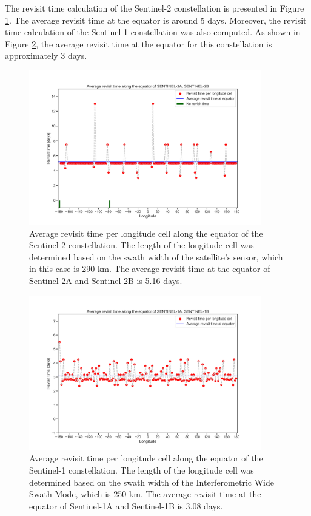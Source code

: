 
\bigskip
The revisit time calculation of the Sentinel-2 constellation is presented in Figure \ref{revisit_time_of_SENTINEL-2A_SENTINEL-2B}. The average revisit time at the equator is around 5 days. Moreover, the revisit time calculation of the Sentinel-1 constellation was also computed. As shown in Figure \ref{revisit_time_of_SENTINEL-1A_SENTINEL-1B}, the average revisit time at the equator for this constellation is approximately 3 days.

\begin{figure}
\centering
\includegraphics[width=0.9\textwidth]{Images/revisit_time_of_SENTINEL-2A_SENTINEL-2B.png}
\caption{Average revisit time per longitude cell along the equator of the Sentinel-2 constellation. The length of the longitude cell was determined based on the swath width of the satellite's sensor, which in this case is 290 km. The average revisit time at the equator of Sentinel-2A and Sentinel-2B is 5.16 days.}
\label{revisit_time_of_SENTINEL-2A_SENTINEL-2B}
\end{figure}

\begin{figure}
\centering
\includegraphics[width=0.9\textwidth]{Images/revisit_time_of_SENTINEL-1A_SENTINEL-1B.png}
\caption{Average revisit time per longitude cell along the equator of the Sentinel-1 constellation. The length of the longitude cell was determined based on the swath width of the Interferometric Wide Swath Mode, which is 250 km. The average revisit time at the equator of Sentinel-1A and Sentinel-1B is 3.08 days.}
\label{revisit_time_of_SENTINEL-1A_SENTINEL-1B}
\end{figure}

